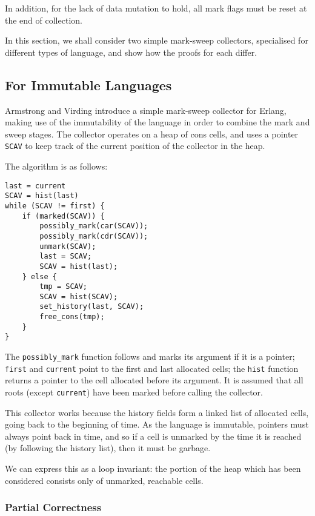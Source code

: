 In addition, for the lack of data mutation to hold, all mark flags
must be reset at the end of collection.

In this section, we shall consider two simple mark-sweep collectors,
specialised for different types of language, and show how the proofs
for each differ.

\subsection{For Immutable Languages}

Armstrong and Virding\cite{Armstrong95} introduce a simple
\gls{mark-sweep} \gls{collector} for Erlang, making use of the
immutability of the language in order to combine the mark and sweep
stages. The \gls{collector} operates on a \gls{heap} of cons cells,
and uses a \gls{pointer} \texttt{SCAV} to keep track of the current
position of the \gls{collector} in the heap.

The algorithm is as follows:

\begin{lstlisting}
last = current
SCAV = hist(last)
while (SCAV != first) {
    if (marked(SCAV)) {
        possibly_mark(car(SCAV));
        possibly_mark(cdr(SCAV));
        unmark(SCAV);
        last = SCAV;
        SCAV = hist(last);
    } else {
        tmp = SCAV;
        SCAV = hist(SCAV);
        set_history(last, SCAV);
        free_cons(tmp);
    }
}
\end{lstlisting}

The \texttt{possibly\_mark} function follows and marks its argument if
it is a pointer; \texttt{first} and \texttt{current} point to the
first and last allocated \glspl{cell}; the \texttt{hist} function
returns a \gls{pointer} to the \gls{cell} allocated before its
argument. It is assumed that all roots (except \texttt{current}) have
been marked before calling the collector.

This \gls{collector} works because the history fields form a linked
list of allocated cells, going back to the beginning of time. As the
language is immutable, pointers must always point back in time, and so
if a cell is unmarked by the time it is reached (by following the
history list), then it must be garbage.

We can express this as a loop invariant: the portion of the heap which
has been considered consists only of unmarked, reachable cells.

\subsubsection{Partial Correctness}

